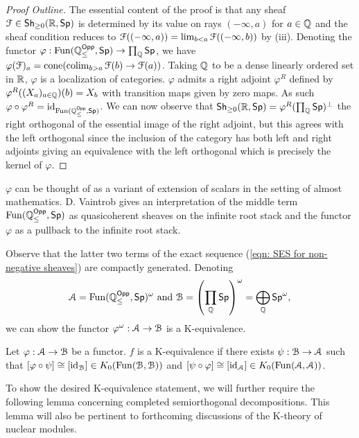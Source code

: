 \begin{proof}[Proof Outline]
    The essential content of the proof is that any sheaf $\EuScript{F}\in\mathsf{Sh}_{\geq0}(\mathbb{R},\mathsf{Sp})$ is determined by its value on rays $(-\infty,a)$ for $a\in\mathbb{Q}$ and the sheaf condition reduces to $\EuScript{F}((-\infty,a))=\lim_{b<a}\EuScript{F}((-\infty,b))$ by  (iii). Denoting the functor $\varphi:\mathrm{Fun}(\mathbb{Q}_{\leq}^{\mathsf{Opp}},\mathsf{Sp})\to\prod_{\mathbb{Q}}\mathsf{Sp}$, we have $\varphi(\EuScript{F})_{a}=\mathrm{cone}(\operatorname{colim}_{b>a}\EuScript{F}(b)\to\EuScript{F}(a))$. Taking $\mathbb{Q}$ to be a dense linearly ordered set in $\mathbb{R}$, $\varphi$ is a localization of categories. $\varphi$ admits a right adjoint $\varphi^{R}$ defined by $\varphi^{R}((X_{a})_{a\in\mathbb{Q}})(b)=X_{b}$ with transition maps given by zero maps. As such $\varphi\circ\varphi^{R}=\mathrm{id}_{\mathrm{Fun}(\mathbb{Q}_{\leq}^{\mathsf{Opp}},\mathsf{Sp})}$. We can now observe that $\mathsf{Sh}_{\geq0}(\mathbb{R},\mathsf{Sp})=\varphi^{R}(\prod_{\mathbb{Q}}\mathsf{Sp})^{\perp}$ the right orthogonal of the essential image of the right adjoint, but this agrees with the left orthogonal since the inclusion of the category has both left and right adjoints giving an equivalence with the left orthogonal which is precisely the kernel of $\varphi$. 
\end{proof}
\begin{remark}
    $\varphi$ can be thought of as a variant of extension of scalars in the setting of almost mathematics. D. Vaintrob gives an interpretation of the middle term $\mathrm{Fun}(\mathbb{Q}_{\leq}^{\mathsf{Opp}},\mathsf{Sp})$ as quasicoherent sheaves on the infinite root stack and the functor $\varphi$ as a pullback to the infinite root stack. 
\end{remark}
Observe that the latter two terms of the exact sequence (\ref{eqn: SES for non-negative sheaves}) are compactly generated. Denoting 
\begin{equation}\label{def: compact objects A and B}
    \EuScript{A}=\mathrm{Fun}(\mathbb{Q}_{\leq}^{\mathsf{Opp}},\mathsf{Sp})^{\omega}\text{ and }\EuScript{B}=\left(\prod_{\mathbb{Q}}\mathsf{Sp}\right)^{\omega}=\bigoplus_{\mathbb{Q}}\mathsf{Sp}^{\omega},
\end{equation}
we can show the functor $\varphi^{\omega}:\EuScript{A}\to\EuScript{B}$ is a K-equivalence. 
\begin{definition}[K-Equivalence]\label{def: K-equivalence}
    Let $\varphi:\EuScript{A}\to\EuScript{B}$ be a functor. $f$ is a K-equivalence if there exists $\psi:\EuScript{B}\to\EuScript{A}$ such that $[\varphi\circ\psi]\cong[\mathrm{id}_{\EuScript{B}}]\in K_{0}(\mathrm{Fun}(\EuScript{B},\EuScript{B}))$ and $[\psi\circ\varphi]\cong[\mathrm{id}_{\EuScript{A}}]\in K_{0}(\mathrm{Fun}(\EuScript{A},\EuScript{A}))$. 
\end{definition} 
To show the desired K-equivalence statement, we will further require the following lemma concerning completed semiorthogonal decompositions. This lemma will also be pertinent to forthcoming discussions of the K-theory of nuclear modules. 
